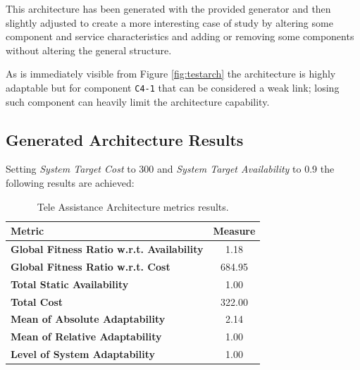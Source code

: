 This architecture has been generated with the provided generator and then slightly adjusted to create a more interesting case of study by altering some component and service characteristics and adding or removing some components without altering the general structure.

As is immediately visible from Figure \ref{fig:testarch} the architecture is highly adaptable but for component \texttt{C4-1} that can be considered a weak link; losing such component can heavily limit the architecture capability. 

\clearpage
\subsection{Generated Architecture Results}

Setting \emph{System Target Cost} to 300 and \emph{System Target Availability} to 0.9 the following results are achieved:

\begin{table}[ht!b]
\centering
	\begin{tabular}{|l|c|}
		\hline
		Metric & Measure \\
		\hline 
		\textbf{Global Fitness Ratio w.r.t. Availability} & 1.18 \\ 
		\hline 
		\textbf{Global Fitness Ratio w.r.t. Cost} & 684.95 \\
		\hline 
		\textbf{Total Static Availability} & 1.00 \\
		\hline 
		\textbf{Total Cost} & 322.00 \\
		\hline 
		\textbf{Mean of Absolute Adaptability} & 2.14 \\
		\hline
		\textbf{Mean of Relative Adaptability} & 1.00 \\
		\hline
		\textbf{Level of System Adaptability} & 1.00 \\
		\hline
	\end{tabular} 
	\caption[TAS Service Architecture Metrics]{Tele Assistance Architecture metrics results.}
	\label{tab:ag-arch-res}
\end{table}

